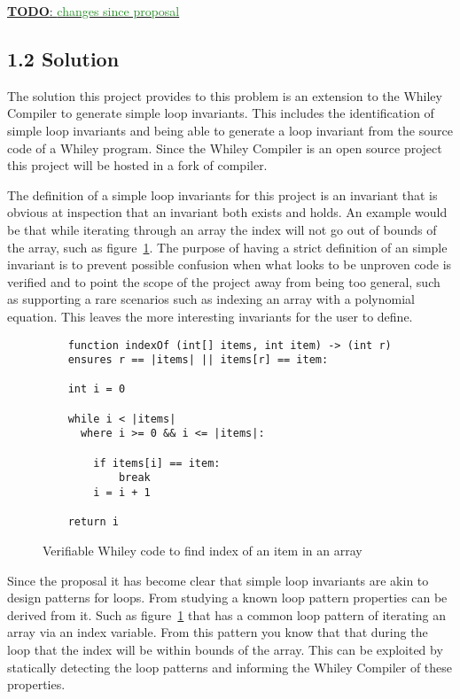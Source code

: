 \documentclass[11pt, a4paper, twoside, openright]{report}
\newcommand{\todo}[1]{\huge{\underline{\textbf{\textcolor{RubineRed}{TODO}}: \textcolor{ForestGreen}{#1}}}\normalsize }
\begin{document}
\todo{changes since proposal}

\subsection*{1.2 Solution}

The solution this project provides to this problem is an extension to
the Whiley Compiler to generate simple loop invariants.
This includes the identification of simple loop invariants and being able
to generate a loop invariant from the source code of a Whiley program.
Since the Whiley Compiler is an open source project this project will be
hosted in a fork of compiler.

The definition of a simple loop invariants for this project is an invariant that is
obvious at inspection that an invariant both exists and holds.
An example would be that while iterating through an array the index
will not go out of bounds of the array, such as figure~\ref{lst:whiley-ex-1}.
The purpose of having a strict definition of an simple invariant is to prevent
possible confusion when what looks to be unproven code is verified and to point
the scope of the project away from being too general, such as supporting
a rare scenarios such as indexing an array with a polynomial equation.
This leaves the more interesting invariants for the user to define.

\begin{figure}[h]
\begin{lstlisting}
    function indexOf (int[] items, int item) -> (int r)
    ensures r == |items| || items[r] == item:

    int i = 0

    while i < |items|
      where i >= 0 && i <= |items|:

        if items[i] == item:
            break
        i = i + 1

    return i
\end{lstlisting}
\caption{Verifiable Whiley code to find index of an item in an array}
\label{lst:whiley-ex-1}
\end{figure}

Since the proposal it has become clear that simple loop invariants are
akin to design patterns for loops.
From studying a known loop pattern properties can be derived from it.
Such as figure~\ref{lst:whiley-ex-1} that has a common loop pattern of
iterating an array via an index variable.
From this pattern you know that that during the loop that the index will be
within bounds of the array.
This can be exploited by statically detecting the loop patterns and informing
the Whiley Compiler of these properties.
\end{document}
